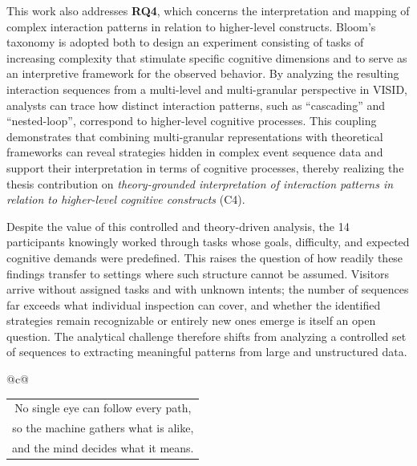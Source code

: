 This work also addresses \textbf{RQ4}, which concerns the interpretation and mapping of complex interaction patterns in relation to higher-level constructs.
Bloom's taxonomy is adopted both to design an experiment consisting of tasks of increasing complexity that stimulate specific cognitive dimensions and to serve as an interpretive framework for the observed behavior.
By analyzing the resulting interaction sequences from a multi-level and multi-granular perspective in \textsc{VISID}, analysts can trace how distinct interaction patterns, such as ``cascading'' and ``nested-loop'', correspond to higher-level cognitive processes.
This coupling demonstrates that combining multi-granular representations with theoretical frameworks can reveal strategies hidden in complex event sequence data and support their interpretation in terms of cognitive processes, thereby realizing the thesis contribution on \textit{theory-grounded interpretation of interaction patterns in relation to higher-level cognitive constructs} (C4).

Despite the value of this controlled and theory-driven analysis, the 14 participants knowingly worked through tasks whose goals, difficulty, and expected cognitive demands were predefined.
This raises the question of how readily these findings transfer to settings where such structure cannot be assumed.
Visitors arrive without assigned tasks and with unknown intents; the number of sequences far exceeds what individual inspection can cover, and whether the identified strategies remain recognizable or entirely new ones emerge is itself an open question.
The analytical challenge therefore shifts from analyzing a controlled set of sequences to extracting meaningful patterns from large and unstructured data.




\label{cha:pub3}

\begin{center}
\begin{tabular}{@{}c@{}}
\\
{\fmmfamily\LARGE
\begin{tabular}{@{}c@{}}
No single eye can follow every path,\\
so the machine gathers what is alike,\\
and the mind decides what it means.
\end{tabular}}\\
\end{tabular}
\end{center}





